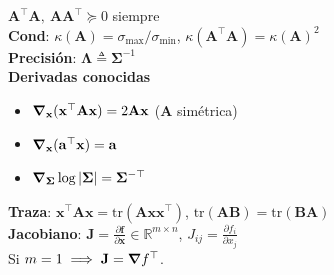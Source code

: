 \documentclass[11pt, a4paper]{article}
\newcommand{\x}{\mathbf{x}}
\begin{document}
\begin{minipage}[t]{0.325\textwidth}
\begin{tcolorbox}[formulabox=Linear Algebra, colframe=softOrange]
        $\mathbf{A}^\top\mathbf{A},\ \mathbf{A}\mathbf{A}^\top \succeq 0$ siempre\\
        \textbf{Cond}: $\kappa(\mathbf{A}) = \sigma_{\max}/\sigma_{\min}$, $\kappa(\mathbf{A}^\top\mathbf{A})=\kappa(\mathbf{A})^2$\\
        \textbf{Precisión}: $\boldsymbol{\Lambda} \triangleq \boldsymbol{\Sigma}^{-1}$\\
        \textbf{Derivadas conocidas} \\
        \begin{itemize}
            \item $\grad_\x (\x^\top\mathbf{A}\x) = 2\mathbf{A}\x$ ($\mathbf{A}$ simétrica)
            \item $\grad_\x (\mathbf{a}^\top\x) = \mathbf{a}$
            \item $\grad_{\boldsymbol{\Sigma}} \log|\boldsymbol{\Sigma}| = \boldsymbol{\Sigma}^{-\top}$
        \end{itemize}        
        \textbf{Traza}: $\x^\top\mathbf{A}\x = \text{tr}(\mathbf{A}\x\x^\top)$, $\text{tr}(\mathbf{AB})=\text{tr}(\mathbf{BA})$ \\
        \textbf{Jacobiano}: $\mathbf{J} = \frac{\partial \mathbf{f}}{\partial \x} \in \mathbb{R}^{m\times n}$, $J_{ij} = \frac{\partial f_i}{\partial x_j}$ \\
        Si $m=1 \implies \mathbf{J} = \grad f^\top$.
    \end{tcolorbox}
\end{minipage}
\end{document}
